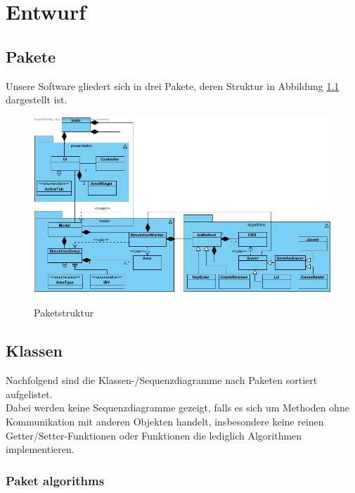 \chapter{Entwurf} \label{Kapitel 3}
\section{Pakete}
Unsere Software gliedert sich in drei Pakete, deren Struktur in Abbildung \ref{Paketdiagramm} dargestellt ist.

\begin{figure}[H]
	\centering
	\includegraphics[scale=.62]{Bilder/Paketdiagramm.jpg}\\
	\caption{Paketstruktur}
	\label{Paketdiagramm}
\end{figure}

\newpage
\section{Klassen} \label{Kapitel 3 Klassen}

Nachfolgend sind die Klassen-/Sequenzdiagramme nach Paketen sortiert aufgelistet. \\
Dabei werden keine Sequenzdiagramme gezeigt, falls es sich um Methoden ohne Kommunikation mit anderen Objekten handelt, insbesondere keine reinen Getter/Setter-Funktionen oder Funktionen die lediglich Algorithmen implementieren.

\subsection{Paket algorithms}

